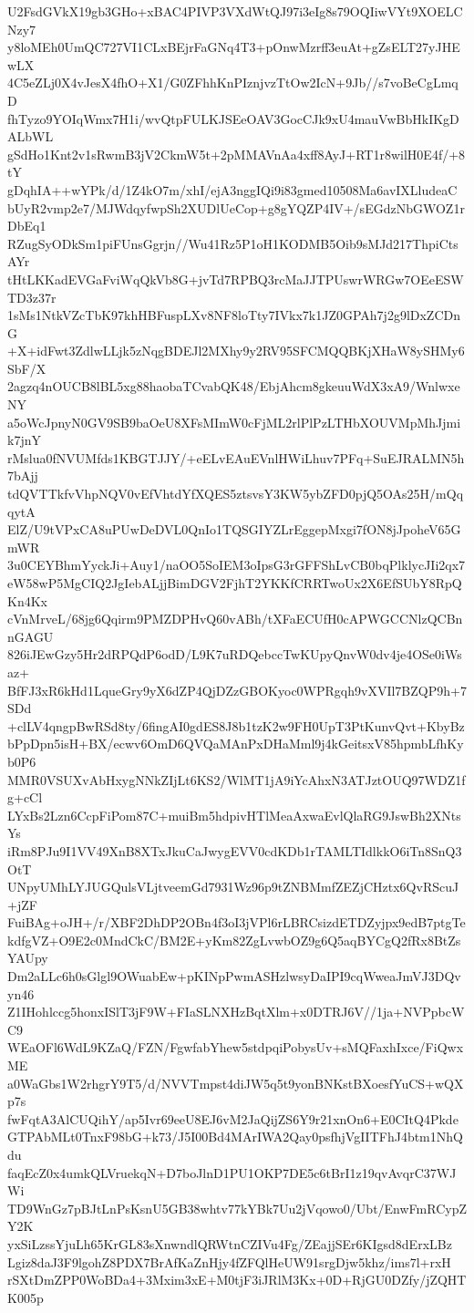 U2FsdGVkX19gb3GHo+xBAC4PIVP3VXdWtQJ97i3eIg8s79OQIiwVYt9XOELCNzy7
y8loMEh0UmQC727VI1CLxBEjrFaGNq4T3+pOnwMzrff3euAt+gZsELT27yJHEwLX
4C5eZLj0X4vJesX4fhO+X1/G0ZFhhKnPIznjvzTtOw2IcN+9Jb//s7voBeCgLmqD
fhTyzo9YOIqWmx7H1i/wvQtpFULKJSEeOAV3GocCJk9xU4mauVwBbHkIKgDALbWL
gSdHo1Knt2v1sRwmB3jV2CkmW5t+2pMMAVnAa4xff8AyJ+RT1r8wilH0E4f/+8tY
gDqhIA++wYPk/d/1Z4kO7m/xhI/ejA3nggIQi9i83gmed10508Ma6avIXLludeaC
bUyR2vmp2e7/MJWdqyfwpSh2XUDlUeCop+g8gYQZP4IV+/sEGdzNbGWOZ1rDbEq1
RZugSyODkSm1piFUnsGgrjn//Wu41Rz5P1oH1KODMB5Oib9sMJd217ThpiCtsAYr
tHtLKKadEVGaFviWqQkVb8G+jvTd7RPBQ3rcMaJJTPUswrWRGw7OEeESWTD3z37r
1sMs1NtkVZcTbK97khHBFuspLXv8NF8loTty7IVkx7k1JZ0GPAh7j2g9lDxZCDnG
+X+idFwt3ZdlwLLjk5zNqgBDEJl2MXhy9y2RV95SFCMQQBKjXHaW8ySHMy6SbF/X
2agzq4nOUCB8lBL5xg88haobaTCvabQK48/EbjAhcm8gkeuuWdX3xA9/WnlwxeNY
a5oWcJpnyN0GV9SB9baOeU8XFsMImW0cFjML2rlPlPzLTHbXOUVMpMhJjmik7jnY
rMslua0fNVUMfds1KBGTJJY/+eELvEAuEVnlHWiLhuv7PFq+SuEJRALMN5h7bAjj
tdQVTTkfvVhpNQV0vEfVhtdYfXQES5ztsvsY3KW5ybZFD0pjQ5OAs25H/mQqqytA
ElZ/U9tVPxCA8uPUwDeDVL0QnIo1TQSGIYZLrEggepMxgi7fON8jJpoheV65GmWR
3u0CEYBhmYyckJi+Auy1/naOO5SoIEM3oIpsG3rGFFShLvCB0bqPlklycJIi2qx7
eW58wP5MgCIQ2JgIebALjjBimDGV2FjhT2YKKfCRRTwoUx2X6EfSUbY8RpQKn4Kx
cVnMrveL/68jg6Qqirm9PMZDPHvQ60vABh/tXFaECUfH0cAPWGCCNlzQCBnnGAGU
826iJEwGzy5Hr2dRPQdP6odD/L9K7uRDQebccTwKUpyQnvW0dv4je4OSe0iWsaz+
BfFJ3xR6kHd1LqueGry9yX6dZP4QjDZzGBOKyoc0WPRgqh9vXVIl7BZQP9h+7SDd
+clLV4qngpBwRSd8ty/6fingAI0gdES8J8b1tzK2w9FH0UpT3PtKunvQvt+KbyBz
bPpDpn5isH+BX/ecwv6OmD6QVQaMAnPxDHaMml9j4kGeitsxV85hpmbLfhKyb0P6
MMR0VSUXvAbHxygNNkZIjLt6KS2/WlMT1jA9iYcAhxN3ATJztOUQ97WDZ1fg+cCl
LYxBs2Lzn6CcpFiPom87C+muiBm5hdpivHTlMeaAxwaEvlQlaRG9JswBh2XNtsYs
iRm8PJu9I1VV49XnB8XTxJkuCaJwygEVV0cdKDb1rTAMLTIdlkkO6iTn8SnQ3OtT
UNpyUMhLYJUGQulsVLjtveemGd7931Wz96p9tZNBMmfZEZjCHztx6QvRScuJ+jZF
FuiBAg+oJH+/r/XBF2DhDP2OBn4f3oI3jVPl6rLBRCsizdETDZyjpx9edB7ptgTe
kdfgVZ+O9E2c0MndCkC/BM2E+yKm82ZgLvwbOZ9g6Q5aqBYCgQ2fRx8BtZsYAUpy
Dm2aLLc6h0sGlgl9OWuabEw+pKINpPwmASHzlwsyDaIPI9cqWweaJmVJ3DQvyn46
Z1IHohlccg5honxISlT3jF9W+FIaSLNXHzBqtXlm+x0DTRJ6V//1ja+NVPpbcWC9
WEaOFl6WdL9KZaQ/FZN/FgwfabYhew5stdpqiPobysUv+sMQFaxhIxce/FiQwxME
a0WaGbs1W2rhgrY9T5/d/NVVTmpst4diJW5q5t9yonBNKstBXoesfYuCS+wQXp7s
fwFqtA3AlCUQihY/ap5Ivr69eeU8EJ6vM2JaQijZS6Y9r21xnOn6+E0CItQ4Pkde
GTPAbMLt0TnxF98bG+k73/J5I00Bd4MArIWA2Qay0psfhjVgIITFhJ4btm1NhQdu
faqEcZ0x4umkQLVruekqN+D7boJlnD1PU1OKP7DE5c6tBrI1z19qvAvqrC37WJWi
TD9WnGz7pBJtLnPsKsnU5GB38whtv77kYBk7Uu2jVqowo0/Ubt/EnwFmRCypZY2K
yxSiLzssYjuLh65KrGL83sXnwndlQRWtnCZIVu4Fg/ZEajjSEr6KIgsd8dErxLBz
Lgiz8daJ3F9lgohZ8PDX7BrAfKaZnHjy4fZFQlHeUW91srgDjw5khz/ims7l+rxH
rSXtDmZPP0WoBDa4+3Mxim3xE+M0tjF3iJRlM3Kx+0D+RjGU0DZfy/jZQHTK005p
